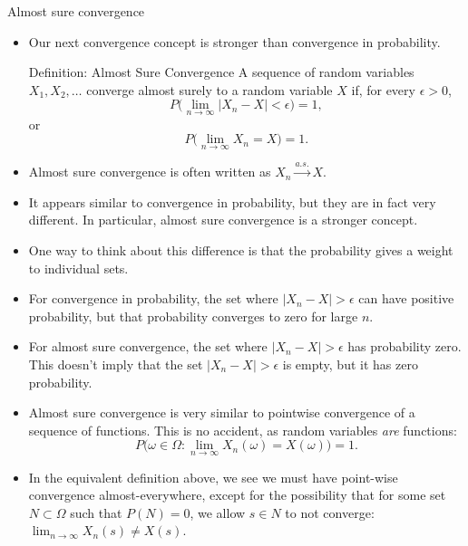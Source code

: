 \begin{frame}[allowframebreaks]{Almost sure convergence}
  \begin{itemize}
    \item Our next convergence concept is stronger than convergence in probability.
    
    \begin{block}{Definition: Almost Sure Convergence}
      A sequence of random variables $X_1, X_2, \ldots$ converge \alert{almost surely} to a random variable $X$ if, for every $\epsilon > 0$,
      $$
      P\big(\lim_{n\rightarrow \infty} |X_n - X| < \epsilon \big) = 1,
      $$
      or
      $$
      P\big(\lim_{n \rightarrow \infty} X_n = X\big) = 1. 
      $$
    \end{block}
    
    \item Almost sure convergence is often written as $X_n \overset{a.s.}{\rightarrow} X$.
    \item It appears similar to convergence in probability, but they are in fact very different. In particular, almost sure convergence is a stronger concept.
    \item One way to think about this difference is that the probability gives a weight to individual sets.
    \item For convergence in probability, the set where $|X_n - X| > \epsilon$ can have positive probability, but that probability converges to zero for large $n$. 
    \item For almost sure convergence, the set where $|X_n - X| > \epsilon$ has probability zero. This doesn't imply that the set $|X_n - X| > \epsilon$ is empty, but it has zero probability.
    \item Almost sure convergence is very similar to pointwise convergence of a sequence of functions. This is no accident, as random variables \emph{are} functions:
    $$
    P\big(\omega \in \Omega: \lim_{n\rightarrow \infty} X_n(\omega) = X(\omega)\big) = 1.
    $$
    \item In the equivalent definition above, we see we must have point-wise convergence \alert{almost-everywhere}, except for the possibility that for some set $N \subset \Omega$ such that $P(N) = 0$, we allow $s \in N$ to not converge: $\lim_{n\rightarrow \infty} X_n(s) \neq X(s)$. 
  \end{itemize}
  
  \framebreak
  

\end{frame}
